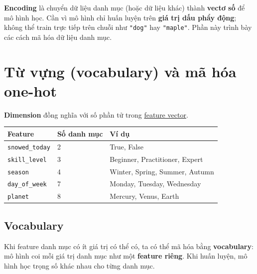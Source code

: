 \documentclass[12pt,a4paper]{article}
\begin{document}
\begin{dinhnghia}[title={Encoding}]
\textbf{Encoding} là chuyển dữ liệu danh mục (hoặc dữ liệu khác) thành \textbf{vectơ số} để mô hình học. Cần vì mô hình chỉ huấn luyện trên \textbf{giá trị dấu phẩy động}; không thể train trực tiếp trên chuỗi như \texttt{"dog"} hay \texttt{"maple"}. Phần này trình bày các cách mã hóa dữ liệu danh mục.
\end{dinhnghia}

\section{Từ vựng (vocabulary) và mã hóa one-hot}

\begin{dinhnghia}[title={Chiều (dimension)}]
\textbf{Dimension} đồng nghĩa với số phần tử trong \href{https://developers.google.com/machine-learning/glossary\#feature-vector}{feature vector}.
\end{dinhnghia}

\begin{vidu}[title={Một số feature danh mục ít chiều}]
\begin{center}
\small
\begin{tabular}{@{}lll@{}}
\toprule
\textbf{Feature} & \textbf{Số danh mục} & \textbf{Ví dụ} \\
\midrule
\texttt{snowed\_today} & 2 & True, False \\
\texttt{skill\_level} & 3 & Beginner, Practitioner, Expert \\
\texttt{season} & 4 & Winter, Spring, Summer, Autumn \\
\texttt{day\_of\_week} & 7 & Monday, Tuesday, Wednesday \\
\texttt{planet} & 8 & Mercury, Venus, Earth \\
\bottomrule
\end{tabular}
\end{center}
\end{vidu}

\subsection{Vocabulary}

\begin{ynghia}
Khi feature danh mục có ít giá trị có thể có, ta có thể mã hóa bằng \textbf{vocabulary}: mô hình coi mỗi giá trị danh mục như một \textbf{feature riêng}. Khi huấn luyện, mô hình học trọng số khác nhau cho từng danh mục.
\end{ynghia}
\end{document}
